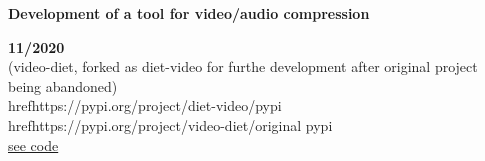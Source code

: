 \begin{minipage}{0.8\textwidth}
    \parbox{0.8\linewidth}{\textbf{Development of a tool for video/audio compression}} \hfill \textbf{11/2020}\\
    (video-diet, forked as diet-video for furthe development after original project being abandoned)\\
    href{https://pypi.org/project/diet-video/}{pypi}\\
    href{https://pypi.org/project/video-diet/}{original pypi}\\
    \href{https://github.com/JavierOramas/video-diet}{see code}\\
    \end{minipage} \hfill {}\\\\
    